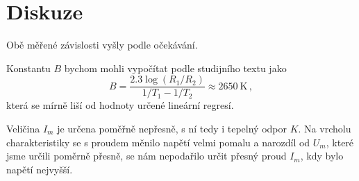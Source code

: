 \section*{Diskuze}
Obě měřené závislosti vyšly podle očekávání.

Konstantu $B$ bychom mohli vypočítat podle studijního textu jako \cite{skripta}
\begin{equation*}
B=\frac{\num{2.3} \log(R_1/R_2)}{1/T_1 - 1/T_2}\approx \SI{2650}{\kelvin} \,,
\end{equation*}
která se mírně liší od hodnoty určené lineární regresí.

Veličina $I_m$ je určena poměřně nepřesně, s ní tedy i tepelný odpor $K$.
Na vrcholu charakteristiky se s proudem měnilo napětí velmi pomalu a narozdíl od $U_m$, které jsme určili poměrně přesně, se nám nepodařilo určit přesný proud $I_m$, kdy bylo napětí nejvyšší.